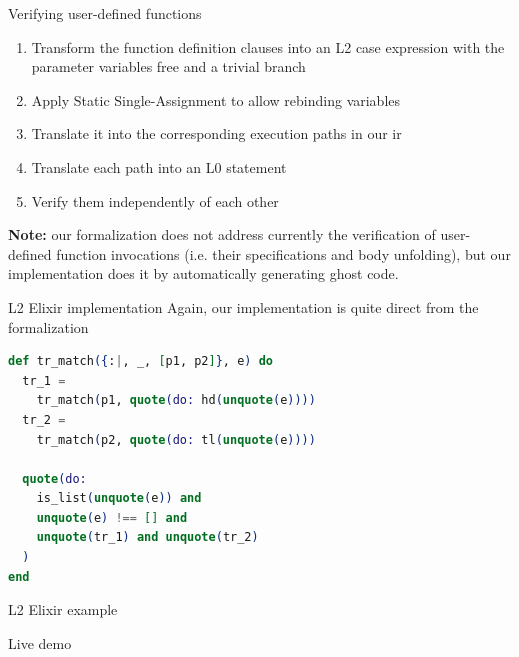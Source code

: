 \documentclass{beamer}
\begin{document}
  \begin{frame}{Verifying user-defined functions}
    \begin{enumerate}
      \item \pause Transform the function definition clauses into an L2 case 
        expression with the parameter variables free and a trivial branch
      \item \pause Apply Static Single-Assignment to allow rebinding variables
      \item \pause Translate it into the corresponding execution paths in our \gls*{ir}
      \item \pause Translate each path into an L0 statement
      \item \pause Verify them independently of each other
    \end{enumerate}

    \pause \textbf{Note:} our formalization does not address currently the verification 
    of user-defined function invocations (i.e. their specifications and body unfolding),
    but our implementation does it by automatically generating ghost code.
  \end{frame}
  \begin{frame}[fragile]{L2 Elixir implementation}
    Again, our implementation is quite direct from the formalization

    \pause
    \small
    \begin{lstlisting}[language=elixir,numbers=none,frame=none]
def tr_match({:|, _, [p1, p2]}, e) do
  tr_1 = 
    tr_match(p1, quote(do: hd(unquote(e))))
  tr_2 = 
    tr_match(p2, quote(do: tl(unquote(e))))

  quote(do:
    is_list(unquote(e)) and 
    unquote(e) !== [] and
    unquote(tr_1) and unquote(tr_2)
  )
end
    \end{lstlisting}
  \end{frame}
  \begin{frame}[plain,c]{L2 Elixir example}
    \begin{center}
      \Huge Live demo
    \end{center}
  \end{frame}
\end{document}
